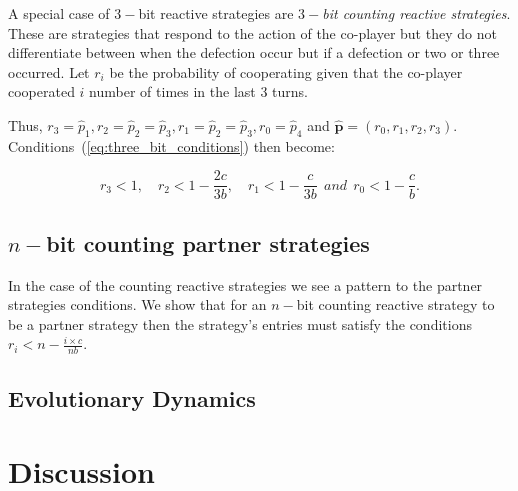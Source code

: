 \documentclass{article}
\theoremstyle{definition}
\begin{document}
A special case of $3-$bit reactive strategies are {\it  $3-$bit counting
reactive strategies}. These are strategies that respond to the action of the
co-player but they do not differentiate between when the defection occur but if
a defection or two or three occurred. Let $r_i$ be the probability of cooperating given
that the co-player cooperated $i$ number of times in the last 3 turns.

Thus, $r_3 = \hat{p}_1, r_2 = \hat{p}_2 =  \hat{p}_3, r_1 = \hat{p}_2 =  \hat{p}_3, r_0 = \hat{p}_4$ and
$\mathbf{\hat{p}}=(r_0, r_1, r_2, r_3)$.
Conditions~(\ref{eq:three_bit_conditions}) then become:

\begin{equation}\label{eq:counting_three_bit_conditions}
  \displaystyle r_3 < 1, \quad r_2 < 1-\frac{2c}{3b}, \quad r_1 < 1-\frac{c}{3b} ~~and~~ r_0 < 1\!-\! \frac{c}{b}.
\end{equation}


\subsection{$n-$bit counting partner strategies}

In the case of the counting reactive strategies we see a pattern to the
partner strategies conditions. We show that for an $n-$bit counting
reactive strategy to be a partner strategy then the strategy's entries
must satisfy the conditions $r_{i} < n - \frac{i \times c}{n b}$.

\subsection{Evolutionary Dynamics}

\section{Discussion}

~\\

\end{document}
